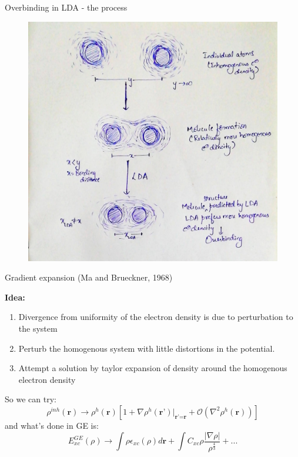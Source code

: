 \documentclass{beamer}
\begin{document}
	\begin{frame}[t]{Overbinding in LDA - the process}
	 \begin{figure}
	  \centering
	  \includegraphics[scale=0.135]{LDA_overbinding.jpg}
	 \end{figure}
	\end{frame}
	
	\begin{frame}[t]{Gradient expansion (Ma and Brueckner, 1968)}
	
	\begin{block}{\textbf{Idea:}}
	\begin{enumerate}
	\item{ Divergence from uniformity of the electron density is due to perturbation to the system}\pause
	\item{Perturb the homogenous system with little distortions in the potential.}\pause
	\item{Attempt a solution by taylor expansion of density around the homogenous electron density}\pause
	\end{enumerate}
	\end{block}
	
	So we can try:
	\begin{equation}\label{eq:14}
		\rho^{inh}(\textbf{r}) \rightarrow \rho^{h}(\textbf{r})\left[1+\nabla \rho^h(\textbf{r'})|_{\textbf{r'=r}} + \mathcal{O}(\nabla^2 \rho^h(\textbf{r})) \right]
	\end{equation}\pause
	and what's done in GE is: 
	\begin{equation}\label{eq:15}
	 E_{xc}^{GE}(\rho) \rightarrow \displaystyle{\int}\rho\epsilon_{xc}(\rho)d\textbf{r} + \displaystyle{\int}C_{xc}\rho\frac{|\nabla\rho|}{\rho^{\frac{4}{3}}} + ...
	\end{equation}
	\end{frame}
	
\end{document}
